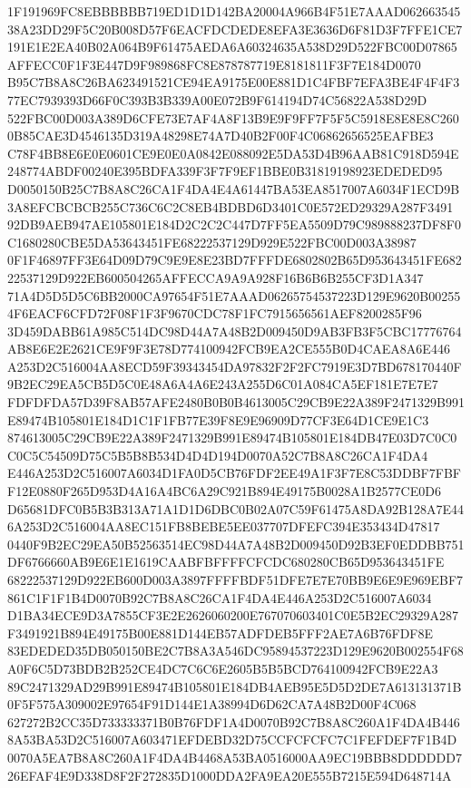 \documentclass[UTF8,fontset=fandol,zihao=-4,a4paper]{ctexart}
\begin{document}
{{1F191969FC8EBBBBBB719ED1D1D142BA20004A966B4F51E7AAAD06266354538A23DD29F5C20B008D57F6EACFDCDEDE8EFA3E3636D6F81D3F7FFE1CE7
191E1E2EA40B02A064B9F61475AEDA6A60324635A538D29D522FBC00D07865AFFECC0F1F3E447D9F989868FC8E878787719E8181811F3F7E184D0070
B95C7B8A8C26BA623491521CE94EA9175E00E881D1C4FBF7EFA3BE4F4F4F377EC7939393D66F0C393B3B339A00E072B9F614194D74C56822A538D29D
522FBC00D003A389D6CFE73E7AF4A8F13B9E9F9FF7F5F5C5918E8E8E8C2600B85CAE3D4546135D319A48298E74A7D40B2F00F4C06862656525EAFBE3
C78F4BB8E6E0E0601CE9E0E0A0842E088092E5DA53D4B96AAB81C918D594E248774ABDF00240E395BDFA339F3F7F9EF1BBE0B31819198923EDEDED95
D0050150B25C7B8A8C26CA1F4DA4E4A61447BA53EA8517007A6034F1ECD9B3A8EFCBCBCB255C736C6C2C8EB4BDBD6D3401C0E572ED29329A287F3491
92DB9AEB947AE105801E184D2C2C2C447D7FF5EA5509D79C989888237DF8F0C1680280CBE5DA53643451FE68222537129D929E522FBC00D003A38987
0F1F46897FF3E64D09D79C9E9E8E23BD7FFFDE6802802B65D953643451FE68222537129D922EB600504265AFFECCA9A9A928F16B6B6B255CF3D1A347
71A4D5D5D5C6BB2000CA97654F51E7AAAD06265754537223D129E9620B002554F6EACF6CFD72F08F1F3F9670CDC78F1FC7915656561AEF8200285F96
3D459DABB61A985C514DC98D44A7A48B2D009450D9AB3FB3F5CBC17776764AB8E6E2E2621CE9F9F3E78D774100942FCB9EA2CE555B0D4CAEA8A6E446
A253D2C516004AA8ECD59F39343454DA97832F2F2FC7919E3D7BD678170440F9B2EC29EA5CB5D5C0E48A6A4A6E243A255D6C01A084CA5EF181E7E7E7
FDFDFDA57D39F8AB57AFE2480B0B0B4613005C29CB9E22A389F2471329B991E89474B105801E184D1C1F1FB77E39F8E9E96909D77CF3E64D1CE9E1C3
874613005C29CB9E22A389F2471329B991E89474B105801E184DB47E03D7C0C0C0C5C54509D75C5B5B8B534D4D4D194D0070A52C7B8A8C26CA1F4DA4
E446A253D2C516007A6034D1FA0D5CB76FDF2EE49A1F3F7E8C53DDBF7FBFF12E0880F265D953D4A16A4BC6A29C921B894E49175B0028A1B2577CE0D6
D65681DFC0B5B3B313A71A1D1D6DBC0B02A07C59F61475A8DA92B128A7E446A253D2C516004AA8EC151FB8BEBE5EE037707DFEFC394E353434D47817
0440F9B2EC29EA50B52563514EC98D44A7A48B2D009450D92B3EF0EDDBB751DF6766660AB9E6E1E1619CAABFBFFFFCFCDC680280CB65D953643451FE
68222537129D922EB600D003A3897FFFFBDF51DFE7E7E70BB9E6E9E969EBF7861C1F1F1B4D0070B92C7B8A8C26CA1F4DA4E446A253D2C516007A6034
D1BA34ECE9D3A7855CF3E2E2626060200E767070603401C0E5B2EC29329A287F3491921B894E49175B00E881D144EB57ADFDEB5FFF2AE7A6B76FDF8E
83EDEDED35DB050150BE2C7B8A3A546DC95894537223D129E9620B002554F68A0F6C5D73BDB2B252CE4DC7C6C6E2605B5B5BCD764100942FCB9E22A3
89C2471329AD29B991E89474B105801E184DB4AEB95E5D5D2DE7A613131371B0F5F575A309002E97654F91D144E1A38994D6D62CA7A48B2D00F4C068
627272B2CC35D733333371B0B76FDF1A4D0070B92C7B8A8C260A1F4DA4B4468A53BA53D2C516007A603471EFDEBD32D75CCFCFCFC7C1FEFDEF7F1B4D
0070A5EA7B8A8C260A1F4DA4B4468A53BA0516000AA9EC19BBB8DDDDDD726EFAF4E9D338D8F2F272835D1000DDA2FA9EA20E555B7215E594D648714A
}}
\end{document}
